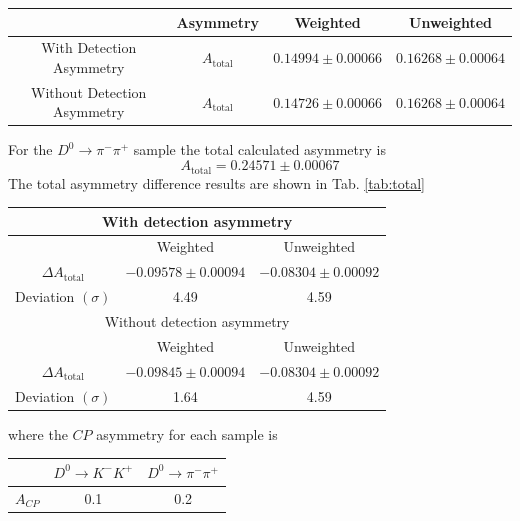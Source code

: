 \documentclass{article}
\begin{document}
    \pagebreak
    \begin{center}
        \begin{tabular}{c|c|c|c}
             &Asymmetry & Weighted & Unweighted\\
             \hline\hline
            With Detection Asymmetry & $A_{\text{total}}$ & $0.14994 \pm 0.00066$ & $0.16268 \pm 0.00064$\\
            \hline
            Without Detection Asymmetry & $A_{\text{total}}$ & $0.14726 \pm 0.00066$ & $0.16268 \pm 0.00064$\\
        \end{tabular}
    \end{center}

    For the $D^0\to \pi^-\pi^+$ sample the total calculated asymmetry is
    \begin{equation}
        A_{\text{total}} = 0.24571 \pm 0.00067
    \end{equation}
    The total asymmetry difference results are shown in Tab. \ref{tab:total}
    \begin{center}
        \begin{tabular}{c|c|c}
            \multicolumn{3}{c}{With detection asymmetry}\\
            \hline
             & Weighted & Unweighted\\
             \hline\hline
            $\Delta A_{\text{total}}$ & $- 0.09578 \pm 0.00094$ & $-0.08304 \pm 0.00092$\\
            Deviation $(\sigma)$&  4.49 & 4.59\\
            \multicolumn{3}{c}{Without detection asymmetry}\\
            \hline
            & Weighted & Unweighted\\
            \hline\hline
           $\Delta A_{\text{total}}$ & $- 0.09845 \pm 0.00094$ & $-0.08304 \pm 0.00092$\\
           Deviation $(\sigma)$&  1.64 & 4.59\\
        \end{tabular}
        \label{tab:total}
    \end{center}
    where the $CP$ asymmetry for each sample is 
    \begin{center}
        \begin{tabular}{c|c|c}
            & $D^0\to K^-K^+$ & $D^0\to \pi^-\pi^+$\\
            \hline\hline
            $A_{CP}$ & 0.1 & 0.2 
        \end{tabular}
    \end{center}
\end{document}
